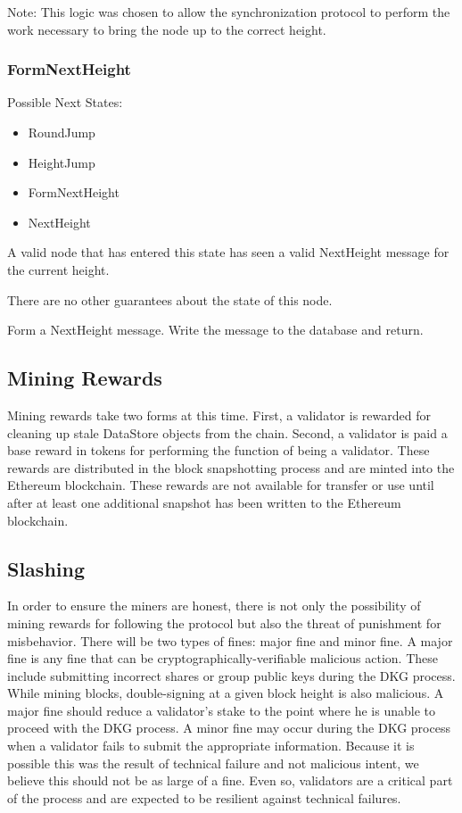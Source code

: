 Note: This logic was chosen to allow the synchronization protocol to
perform the work necessary to bring the node up to the correct height.


\subsubsection{FormNextHeight}

Possible Next States:

\begin{itemize}
    \item RoundJump
    \item HeightJump
    \item FormNextHeight
    \item NextHeight
\end{itemize}

A valid node that has entered this state has seen a valid NextHeight
message for the current height.

There are no other guarantees about the state of this node.

Form a NextHeight message.
Write the message to the database and return.


\subsection{Mining Rewards}

Mining rewards take two forms at this time.
First, a validator is rewarded for cleaning up stale DataStore objects
from the chain.
Second, a validator is paid a base reward in tokens for performing the
function of being a validator.
These rewards are distributed in the block snapshotting process and are
minted into the Ethereum blockchain.
These rewards are not available for transfer or use until after at
least one additional snapshot has been written to the Ethereum
blockchain.


\subsection{Slashing}

In order to ensure the miners are honest, there is not only the
possibility of mining rewards for following the protocol but also
the threat of punishment for misbehavior.
There will be two types of fines: major fine and minor fine.
A major fine is any fine that can be cryptographically-verifiable
malicious action.
These include submitting incorrect shares or group public keys during
the DKG process.
While mining blocks, double-signing at a given block height is
also malicious.
A major fine should reduce a validator's stake to the point where he
is unable to proceed with the DKG process.
A minor fine may occur during the DKG process when a validator fails
to submit the appropriate information.
Because it is possible this was the result of technical failure and
not malicious intent, we believe this should not be as large of a fine.
Even so, validators are a critical part of the process and are expected
to be resilient against technical failures.



